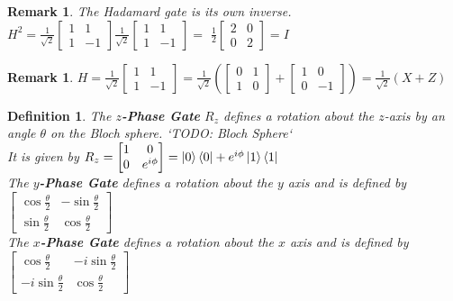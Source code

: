 \documentclass[12pt,twoside]{report}
\theoremstyle{thmstyle}
\newtheorem{defn}[subsection]{Definition}
\newtheorem{remark}[subsection]{Remark}
\begin{document}
\begin{remark}
    The Hadamard gate is its own inverse.\\
    $H^2 = \frac{1}{\sqrt{2}} \begin{bmatrix} 1 & 1 \\ 1 & -1 \end{bmatrix} \frac{1}{\sqrt{2}} \begin{bmatrix} 1 & 1 \\ 1 & -1 \end{bmatrix} = $
    $\frac{1}{2} \begin{bmatrix}2 & 0 \\ 0 & 2 \end{bmatrix} = I$
\end{remark}
\begin{remark}
    $H =   \frac{1}{\sqrt{2}} \begin{bmatrix} 1 & 1 \\ 1 & -1 \end{bmatrix} = \frac{1}{\sqrt{2}} \left( \begin{bmatrix} 0 & 1 \\ 1 & 0 \end{bmatrix}  + \begin{bmatrix} 1 & 0 \\ 0 & -1 \end{bmatrix} \right) = \frac{1}{\sqrt{2}} (X + Z)$
\end{remark}

\begin{defn}
    The \textbf{$z$-Phase Gate} $R_z$ defines a rotation about the $z$-axis by an angle $\theta$ on the Bloch sphere. `TODO: Bloch Sphere`\\
    It is given by $R_z= \begin{bmatrix} 1 & 0 \\ 0 & e^{i\phi} \end{bmatrix} = \ket{0}\bra{0} + e^{i\phi} \ket{1}\bra{1}$ \\

    The \textbf{$y$-Phase Gate} defines a rotation about the $y$ axis and is defined by \\
    $\begin{bmatrix} \cos \frac{\theta}{2} & - \sin \frac{\theta}{2} \\ \sin \frac{\theta}{2} & \cos \frac{\theta}{2} \end{bmatrix}$ \\
    The \textbf{$x$-Phase Gate} defines a rotation about the $x$ axis and is defined by \\
    $\begin{bmatrix} \cos \frac{\theta}{2} & - i \sin \frac{\theta}{2} \\ - i \sin \frac{\theta}{2} & \cos \frac{\theta}{2} \end{bmatrix}$
\end{defn}
\end{document}
